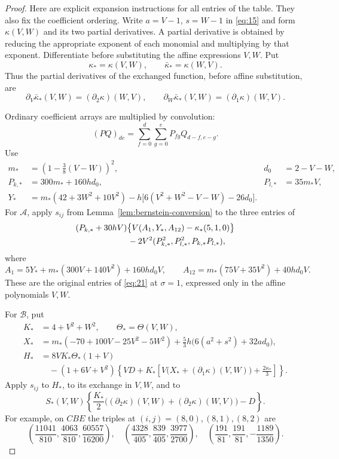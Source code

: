 \begin{proof}
Here are explicit expansion instructions for all entries of the table.
They also fix the coefficient ordering. Write
$a=V-1$, $s=W-1$ in \eqref{eq:15} and form $\kappa(V,W)$ and
its two partial derivatives. A partial derivative is obtained by
reducing the appropriate exponent of each monomial and multiplying by
that exponent. Differentiate before substituting the affine expressions
$V,W$. Put
\[
 \kappa_* =\kappa(V,W),\qquad \bar\kappa_* =\kappa(W,V).
\]
Thus the partial derivatives of the exchanged function, before affine
substitution, are
\[
 \partial_V\bar\kappa_*(V,W)=(\partial_2\kappa)(W,V),\qquad
 \partial_W\bar\kappa_*(V,W)=(\partial_1\kappa)(W,V).
\]

Ordinary coefficient arrays are multiplied by convolution:
\[
 (PQ)_{de}=\sum_{f=0}^d\sum_{g=0}^e P_{fg}Q_{d-f,e-g}.
\]
Use
\[
\begin{aligned}
 m_*&=\left(1-\frac38(V-W)\right)^2,
       &d_0&=2-V-W,\\
 P_{k,*}&=300m_*+160h d_0,
       &P_{l,*}&=35m_*V,\\
 Y_*&=m_*(42+3W^2+10V^2)
       -h\bigl[6(V^2+W^2-V-W)-26d_0\bigr].
\end{aligned}
\]
For $\mathcal A$, apply $s_{ij}$ from
Lemma~\ref{lem:bernstein-conversion} to the three entries of
\[
\begin{aligned}
 &(P_{k,*}+30hV)
       \bigl\{V(A_1,Y_*,A_{12})-\kappa_*(5,1,0)\bigr\}\\
 &\hspace{22mm}-2V^2(P_{k,*}^2,P_{l,*}^2,P_{k,*}P_{l,*}),
\end{aligned}
\]
where
\[
 A_1=5Y_*+m_*(300V+140V^2)+160h d_0V,
 \qquad
 A_{12}=m_*(75V+35V^2)+40h d_0V.
\]
These are the original entries of \eqref{eq:21} at $\sigma=1$, expressed
only in the affine polynomials $V,W$.

For $\mathcal B$, put
\[
\begin{aligned}
 K_*&=4+V^2+W^2,\qquad \Theta_* =\Theta(V,W),\\
 X_*&=m_*(-70+100V-25V^2-5W^2)
       +\frac53h\bigl(6(a^2+s^2)+32a d_0\bigr),\\
 H_*&=8VK_*\Theta_*(1+V)\\
 &\quad-(1+6V+V^2)
       \left\{VD+K_*\left[V\bigl(X_*+(\partial_1\kappa)(V,W)\bigr)
                                     +\frac{2\kappa_*}{3}\right]\right\}.
\end{aligned}
\]
Apply $s_{ij}$ to $H_*$, to its exchange in $V,W$, and to
\[
 S_*(V,W)\left\{
       \frac{K_*}{2}\bigl((\partial_2\kappa)(V,W)
                        +(\partial_2\kappa)(W,V)\bigr)-D\right\}.
\]
For example, on $CBE$ the triples at $(i,j)=(8,0),(8,1),(8,2)$ are
\[
 \left(\frac{11041}{810},\frac{4063}{810},\frac{60557}{16200}\right),
 \quad
 \left(\frac{4328}{405},\frac{839}{405},\frac{3977}{2700}\right),
 \quad
 \left(\frac{191}{81},\frac{191}{81},-\frac{1189}{1350}\right).
\]


\end{proof}
